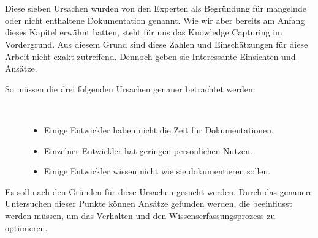 \documentclass[a4paper,12pt,twoside]{scrartcl}
\begin{document}
\\\\
Diese sieben Ursachen wurden von den Experten als Begründung für mangelnde oder nicht enthaltene Dokumentation genannt. Wie wir aber bereits am Anfang dieses Kapitel erwähnt hatten, steht für uns das Knowledge Capturing im Vordergrund. Aus diesem Grund sind diese Zahlen und Einschätzungen für diese Arbeit nicht exakt zutreffend. Dennoch geben sie Interessante Einsichten und Ansätze.    
\begin{description}
   \item[So müssen die drei folgenden Ursachen genauer betrachtet werden:]~\par
   \begin{itemize}
      \item Einige Entwickler haben nicht die Zeit für Dokumentationen.
      \item Einzelner Entwickler hat geringen persönlichen Nutzen.
      \item Einige Entwickler wissen nicht wie sie dokumentieren sollen.
   \end{itemize}
\end{description}
Es soll nach den Gründen für diese Ursachen gesucht werden. Durch das genauere Untersuchen dieser Punkte können Ansätze gefunden werden, die beeinflusst werden müssen, um das Verhalten und den Wissenserfassungsprozess zu optimieren. 
\end{document}
